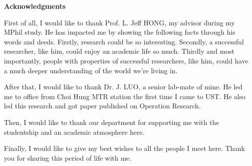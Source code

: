 \centerline{{\bf \Large Acknowledgments}} \vspace{5mm} \noindent

First of all, I would like to thank Prof. L. Jeff HONG, my advisor during my MPhil study. He has impacted me by showing the following facts through his words and deeds. Firstly, research could be so interesting. Secondly, a successful researcher, like him, could enjoy an academic life so much. Thirdly and most importantly, people with properties of successful researchers, like him, could have a much deeper understanding of the world we're living in.

After that, I would like to thank Dr. J. LUO, a senior lab-mate of mine. He led me to office from Choi Hung MTR station the first time I came to UST. He also led this research and got paper published on Operation Research.

Then, I would like to thank our department for supporting me with the studentship and an academic atmosphere here.

Finally, I would like to give my best wishes to all the people I meet here. Thank you for sharing this period of life with me.
